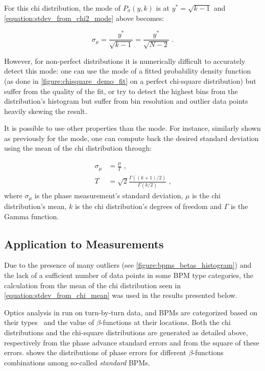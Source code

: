 For this chi distribution, the mode of \(P_{\sigma}(y , k)\) is at \(y^*=\sqrt{k-1}\) and \cref{equation:stdev_from_chi2_mode} above becomes:

\begin{equation}
    \sigma_{\mu} = \frac{y^*}{\sqrt{k - 1}} = \frac{y^*}{\sqrt{N - 2}} \text{ .}
    \label{equation:stdev_from_mode}
\end{equation}

However, for non-perfect distributions it is numerically difficult to accurately detect this mode: one can use the mode of a fitted probability density function (as done in \cref{figure:chisquare_demo_fit} on a perfect chi-square distribution) but suffer from the quality of the fit, or try to detect the highest bins from the distribution's histogram but suffer from bin resolution and outlier data points heavily skewing the result.

It is possible to use other properties than the mode.
For instance, similarly shown as previously for the mode, one can compute back the desired standard deviation using the mean of the chi distribution through:

\begin{equation}
	\begin{aligned}
        \sigma_{\mu} &= \frac{\mu}{T} \text{ ,} \\
        T            &= \sqrt{2} \frac{\Gamma((k + 1) / 2)}{\Gamma(k / 2)} \text{ ,}
	\end{aligned}	
    \label{equation:stdev_from_chi_mean}
\end{equation}
where \(\sigma_{\mu}\) is the phase measurement's standard deviation, \(\mu\) is the chi distribution's mean, \(k\) is the chi distribution's degrees of freedom and \(\Gamma\) is the Gamma function.

\subsection{Application to Measurements}

Due to the presence of many outliers (see \cref{figure:bpms_betas_histogram}) and the lack of a sufficient number of data points in some BPM type categories, the calculation from the mean of the chi distribution seen in \cref{equation:stdev_from_chi_mean} was used in the results presented below.

Optics analysis in run on turn-by-turn data, and BPMs are categorized based on their types~\cite{CERN:Equipment_Codes} and the value of \(\beta\)-functions at their locations.
Both the chi distributions and the chi-square distributions are generated as detailed above, respectively from the phase advance standard errors and from the square of these errors.
 shows the distributions of phase errors for different \(\beta\)-functions combinations among so-called \textit{standard} BPMs.

